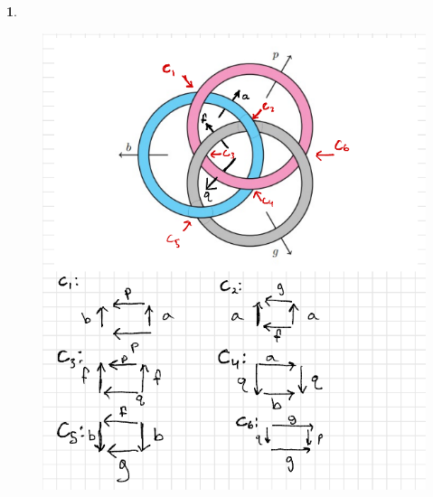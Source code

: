 \documentclass[10.5pt]{article}
\theoremstyle{definition}
\newtheorem{pb}{}
\begin{document}
\begin{pb}
        \begin{figure}
            \centering
            \includegraphics[scale=1]{graphics/Borromean Rings.png}
        \end{figure}
    \end{pb}
\end{document}

